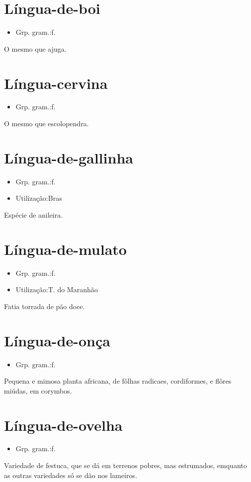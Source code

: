 \section{Língua-de-boi}
\begin{itemize}
\item {Grp. gram.:f.}
\end{itemize}
O mesmo que \textunderscore ajuga\textunderscore .
\section{Língua-cervina}
\begin{itemize}
\item {Grp. gram.:f.}
\end{itemize}
O mesmo que \textunderscore escolopendra\textunderscore .
\section{Língua-de-gallinha}
\begin{itemize}
\item {Grp. gram.:f.}
\end{itemize}
\begin{itemize}
\item {Utilização:Bras}
\end{itemize}
Espécie de anileira.
\section{Língua-de-mulato}
\begin{itemize}
\item {Grp. gram.:f.}
\end{itemize}
\begin{itemize}
\item {Utilização:T. do Maranhão}
\end{itemize}
Fatia torrada de pão doce.
\section{Língua-de-onça}
\begin{itemize}
\item {Grp. gram.:f.}
\end{itemize}
Pequena e mimosa planta africana, de fôlhas radicaes, cordiformes, e flôres miúdas, em corymbos.
\section{Língua-de-ovelha}
\begin{itemize}
\item {Grp. gram.:f.}
\end{itemize}
Variedade de festuca, que se dá em terrenos pobres, mas estrumados, emquanto as outras variedades só se dão nos lameiros.
